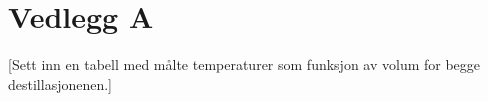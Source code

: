 \section*{Vedlegg A}

[Sett inn en tabell med målte temperaturer som funksjon av volum for begge destillasjonenen.]
